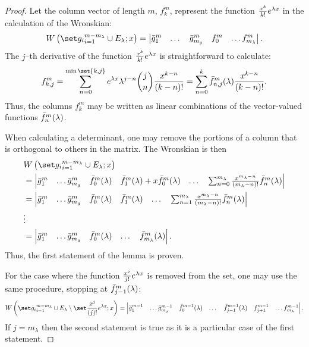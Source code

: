 \documentclass{book}
\begin{document}
\begin{proof}
Let the column vector of length $m$, $f_k^m$, represent the function $\Poly{k} e^{\lambda x}$ in the calculation of the Wronskian:
\begin{equation*}
\Wspecone = \begin{vmatrix} \bar{g}_1^m & \dots & \bar{g}_{m_g}^m & f_0^m & \dots f_{m_\lambda}^m \end{vmatrix} .
\end{equation*}
The $j$--th derivative of the function $\Poly{k} e^{\lambda x}$ is straightforward to calculate:
\begin{equation*}
f_{k,j}^m = \sum_{n=0}^{\min \set{k,j}} e^{\lambda x} \lambda^{j-n} \binom{j}{n} \poly{k-n} = \sum_{n=0}^k \fmn{n,j}{m}(\lambda) \poly{k-n}.
\end{equation*}
Thus, the columns $f_k^m$ may be written as linear combinations of the vector-valued functions $\fmn{n}{m}(\lambda)$.

When calculating a determinant, one may remove the portions of a column that is orthogonal to others in the matrix.
The Wronskian is then
\begin{equation*}
\begin{split}
& \Wspecone \\ & = \begin{vmatrix} \bar{g}_1^m & \dots \bar{g}_{m_g}^m & \fmn{0}{m}(\lambda) & \fmn{1}{m}(\lambda) + x \fmn{0}{m}(\lambda) & \dots & \sum_{n=0}^{m_\lambda} \poly{m_\lambda - n} \fmn{n}{m}(\lambda) \end{vmatrix} \\
& = \begin{vmatrix} \bar{g}_1^m & \dots \bar{g}_{m_g}^m & \fmn{0}{m}(\lambda) & \fmn{1}{m}(\lambda) & \dots & \sum_{n=1}^{m_\lambda} \poly{m_\lambda - n} \fmn{n}{m}(\lambda) \end{vmatrix} \\
& \vdots \\
& = \begin{vmatrix} \bar{g}_1^m & \dots \bar{g}_{m_g}^m & \fmn{0}{m}(\lambda) & \dots & \fmn{m_\lambda}{m}(\lambda) \end{vmatrix} .
\end{split}
\end{equation*}
Thus, the first statement of the lemma is proven.

For the case where the function $\Poly{j} e^{\lambda x}$ is removed from the set, one may use the same procedure, stopping at $\fmn{j-1}{m}(\lambda)$:
\begin{equation*}
\Wspectwo{j} = \begin{vmatrix} \bar{g}_1^{m-1} & \dots \bar{g}_{m_g}^{m-1} & \fmn{0}{m-1}(\lambda) & \dots & \fmn{j-1}{m-1}(\lambda) & f_{j+1}^{m-1} & \dots f_{m_\lambda}^{m-1} \end{vmatrix} .
\end{equation*}
If $j = m_\lambda$ then the second statement is true as it is a particular case of the first statement.


\end{proof}
\end{document}
